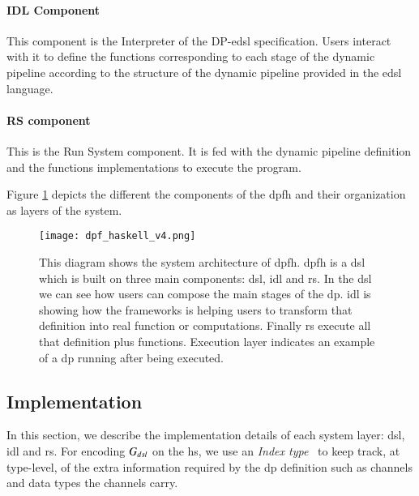
\paragraph{IDL Component} This component is the Interpreter of the DP-\acrshort{edsl} specification. Users interact with it to define the functions corresponding to  each stage of the dynamic pipeline according to the structure of the dynamic pipeline provided in the \acrshort{edsl} language.  

\paragraph{RS component} This is the Run System component. It is fed with the dynamic pipeline definition and the functions implementations to execute the program. 

Figure \ref{fig:dpfh:1} depicts the different the components of the \acrshort{dpfh} and their organization as layers of the system.
%
\begin{figure}[!ht]
  \centering
   \texttt{[image: dpf\_haskell\_v4.png]}
    \caption[{[\acrshort{dpfh}] System Architecture of the \acrshort{dpfh}}]{This diagram shows the system architecture of \acrshort{dpfh}. \acrshort{dpfh} is a \acrshort{dsl} which is built on three main components: \acrshort{dsl}, \acrshort{idl} and \acrshort{rs}. In the \acrshort{dsl} we can see how users can compose the main stages of the \acrshort{dp}. \acrshort{idl} is showing how the frameworks is helping users to transform that definition into real function or computations. Finally \acrshort{rs} execute all that definition plus functions. Execution layer indicates an example of a \acrshort{dp} running after being executed.}
    \label{fig:dpfh:1}
\end{figure}
%

\subsection{Implementation}
In this section, we describe the implementation details of each system layer: \acrshort{dsl}, \acrshort{idl} and \acrshort{rs}.
For encoding $G_{dsl}$ on the \acrshort{hs}, we use an \emph{Index type}~\cite{type-index} to keep track, at type-level, of the extra information required by the \acrshort{dp} definition such as channels and data types the channels carry. 

